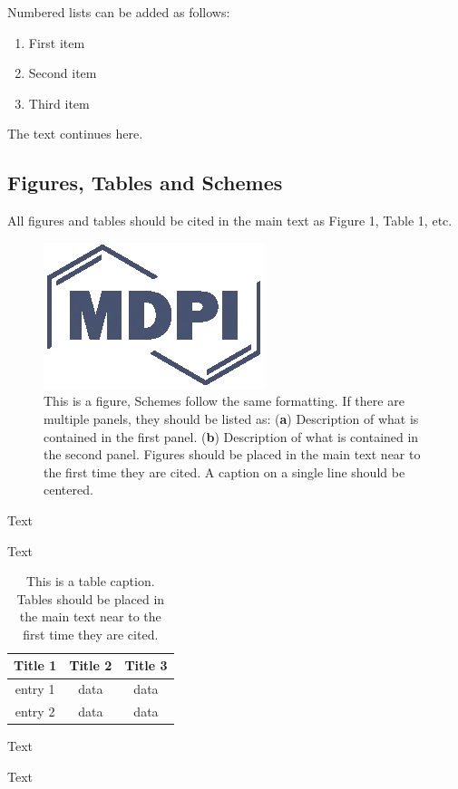 \documentclass[journal,article,submit,moreauthors,pdftex,10pt,a4paper]{Definitions/mdpi}
\theoremstyle{plain}
\theoremstyle{definition}
\theoremstyle{remark}
\begin{document}
\begin{steps}
Numbered lists can be added as follows:
\begin{enumerate}[leftmargin=*,labelsep=4.9mm]
\item	First item 
\item	Second item
\item	Third item
\end{enumerate}

The text continues here.

\subsection{Figures, Tables and Schemes}

All figures and tables should be cited in the main text as Figure 1, Table 1, etc.

\begin{figure}[H]
\centering
\includegraphics[width=2 cm]{Definitions/logo-mdpi}
\caption{This is a figure, Schemes follow the same formatting. If there are multiple panels, they should be listed as: (\textbf{a}) Description of what is contained in the first panel. (\textbf{b}) Description of what is contained in the second panel. Figures should be placed in the main text near to the first time they are cited. A caption on a single line should be centered.}
\end{figure}   
 
Text

Text

\begin{table}[H]
\caption{This is a table caption. Tables should be placed in the main text near to the first time they are cited.}
\centering
\begin{tabular}{ccc}
\toprule
\textbf{Title 1}	& \textbf{Title 2}	& \textbf{Title 3}\\
\midrule
entry 1		& data			& data\\
entry 2		& data			& data\\
\bottomrule
\end{tabular}
\end{table}

Text

Text




\end{steps}
\end{document}
